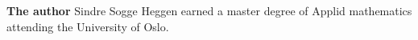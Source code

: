 


	\newpage
	\pagecolor{Aquamarine!30}
	\thispagestyle{empty}
	\textbf{The author} \os
	Sindre Sogge Heggen earned a master degree of Applid mathematics attending the University of Oslo.
